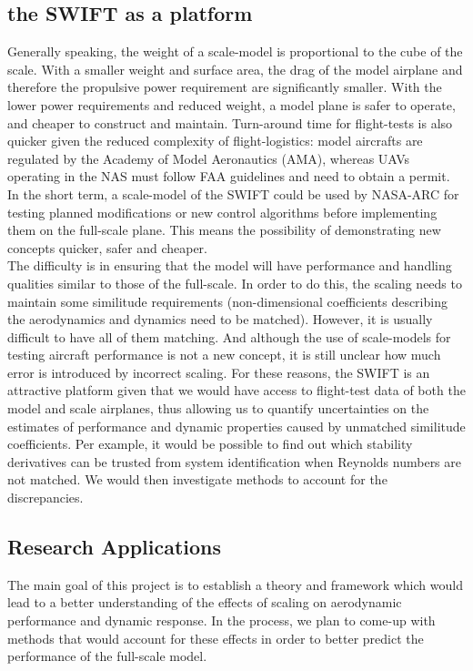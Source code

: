 \documentclass[titlepage,10pt]{article}
\begin{document}
\subsection{the SWIFT as a platform}
Generally speaking, the weight of a scale-model is proportional to the cube of the scale. With a smaller weight and surface area, the drag of the model airplane and therefore the propulsive power requirement are significantly smaller. With the lower power requirements and reduced weight, a model plane is safer to operate, and cheaper to construct and maintain. Turn-around time for flight-tests is also quicker given the reduced complexity of flight-logistics: model aircrafts are regulated by the Academy of Model Aeronautics (AMA), whereas UAVs operating in the NAS must follow FAA guidelines and need to obtain a permit.\\

In the short term, a scale-model of the SWIFT could be used by NASA-ARC for testing planned modifications or new control algorithms before implementing them on the full-scale plane. This means the possibility of demonstrating new concepts quicker, safer and cheaper. \\

\enlargethispage{2\baselineskip}
The difficulty is in ensuring that the model will have performance and handling qualities similar to those of the full-scale. In order to do this, the scaling needs to maintain some similitude requirements \cite{Wolowicz} (non-dimensional coefficients describing the aerodynamics and dynamics need to be matched). However, it is usually difficult to have all of them matching. And although the use of scale-models for testing aircraft performance is not a new concept, it is still unclear how much error is introduced by incorrect scaling. For these reasons, the SWIFT is an attractive platform given that we would have access to flight-test data of both the model and scale airplanes, thus allowing us to quantify uncertainties on the estimates of performance and dynamic properties caused by unmatched similitude coefficients. Per example, it would be possible to find out which stability derivatives can be trusted from system identification when Reynolds numbers are not matched. We would then investigate methods to account for the discrepancies.\\

\subsection{Research Applications}
The main goal of this project is to establish a theory and framework which would lead to a better understanding of the effects of scaling on aerodynamic performance and dynamic response. In the process, we plan to come-up with methods that would account for these effects in order to better predict the performance of the full-scale model.\\
\end{document}
